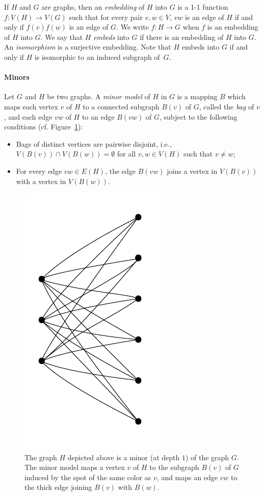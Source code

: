 If $H$ and $G$ are graphs, then an \emph{embedding}
of $H$ into $G$ is a 1-1 function $f:V(H)\to V(G)$
such that for every pair $v,w\in V$, 
$vw$ is an edge of $H$ if and only if $f(v)f(w)$ is an edge of $G$. 
We write $f:H\to G$ when $f$ is an embedding of $H$ into $G$.
We say that $H$ \emph{embeds} into $G$ if there is an embedding of $H$ into $G$.
An \emph{isomorphism} is a surjective embedding.  Note that $H$ embeds into $G$ if and only if $H$ is isomorphic to an induced subgraph of~$G$.


\paragraph{Minors}
Let $G$ and $H$ be two graphs.
A \emph{minor model} of $H$ in $G$
is a mapping $B$
which maps each vertex $v$ of $H$ to a connected subgraph $B(v)$ of $G$,
called the \emph{bag} of $v$,
and each edge $vw$ of $H$ to an edge $B(vw)$ of $G$,
subject to the following conditions
(cf. Figure~\ref{fig:minor}):
\begin{itemize}
	\item Bags of distinct vertices are pairwise disjoint, i.e.,  $V(B(v))\cap V(B(w))=\emptyset$ for all
	 $v,w\in V(H)$ such that $v\neq w$;
	\item For every edge $vw\in E(H)$, the edge $B(vw)$ joins a vertex in $V(B(v))$ with a vertex in $V(B(w))$.
\end{itemize}



\begin{figure}[h]
  \centering
    \includegraphics[scale=0.35,page=6]{pictures.pdf}
  \caption{The graph $H$ depicted above is a minor (at depth $1$) of the graph $G$. The minor model maps a vertex $v$ of $H$ to the subgraph $B(v)$ of $G$ induced by the spot of the same color as $v$,
  and maps an edge $vw$ to the thick edge joining $B(v)$ with $B(w)$.
  }
   \label{fig:minor}
\end{figure}

